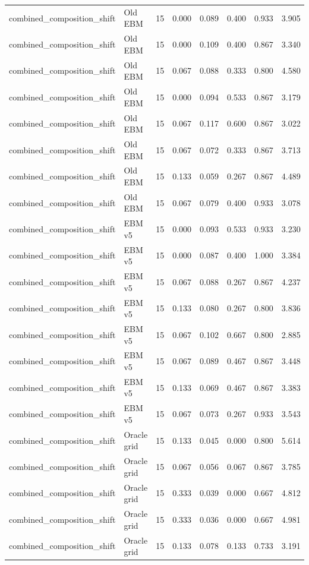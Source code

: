 {\begin{longtable}{llrrrrrr}
combined\_composition\_shift & Old EBM & 15 & 0.000 & 0.089 & 0.400 & 0.933 & 3.905 \\
combined\_composition\_shift & Old EBM & 15 & 0.000 & 0.109 & 0.400 & 0.867 & 3.340 \\
combined\_composition\_shift & Old EBM & 15 & 0.067 & 0.088 & 0.333 & 0.800 & 4.580 \\
combined\_composition\_shift & Old EBM & 15 & 0.000 & 0.094 & 0.533 & 0.867 & 3.179 \\
combined\_composition\_shift & Old EBM & 15 & 0.067 & 0.117 & 0.600 & 0.867 & 3.022 \\
combined\_composition\_shift & Old EBM & 15 & 0.067 & 0.072 & 0.333 & 0.867 & 3.713 \\
combined\_composition\_shift & Old EBM & 15 & 0.133 & 0.059 & 0.267 & 0.867 & 4.489 \\
combined\_composition\_shift & Old EBM & 15 & 0.067 & 0.079 & 0.400 & 0.933 & 3.078 \\
combined\_composition\_shift & EBM v5 & 15 & 0.000 & 0.093 & 0.533 & 0.933 & 3.230 \\
combined\_composition\_shift & EBM v5 & 15 & 0.000 & 0.087 & 0.400 & 1.000 & 3.384 \\
combined\_composition\_shift & EBM v5 & 15 & 0.067 & 0.088 & 0.267 & 0.867 & 4.237 \\
combined\_composition\_shift & EBM v5 & 15 & 0.133 & 0.080 & 0.267 & 0.800 & 3.836 \\
combined\_composition\_shift & EBM v5 & 15 & 0.067 & 0.102 & 0.667 & 0.800 & 2.885 \\
combined\_composition\_shift & EBM v5 & 15 & 0.067 & 0.089 & 0.467 & 0.867 & 3.448 \\
combined\_composition\_shift & EBM v5 & 15 & 0.133 & 0.069 & 0.467 & 0.867 & 3.383 \\
combined\_composition\_shift & EBM v5 & 15 & 0.067 & 0.073 & 0.267 & 0.933 & 3.543 \\
combined\_composition\_shift & Oracle grid & 15 & 0.133 & 0.045 & 0.000 & 0.800 & 5.614 \\
combined\_composition\_shift & Oracle grid & 15 & 0.067 & 0.056 & 0.067 & 0.867 & 3.785 \\
combined\_composition\_shift & Oracle grid & 15 & 0.333 & 0.039 & 0.000 & 0.667 & 4.812 \\
combined\_composition\_shift & Oracle grid & 15 & 0.333 & 0.036 & 0.000 & 0.667 & 4.981 \\
combined\_composition\_shift & Oracle grid & 15 & 0.133 & 0.078 & 0.133 & 0.733 & 3.191 \\

\end{longtable}}
